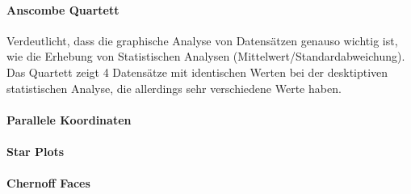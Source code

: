 \documentclass[ngerman]{scrartcl}
\begin{document}
\paragraph{Anscombe Quartett} Verdeutlicht, dass die graphische Analyse von Datensätzen genauso wichtig ist, wie die Erhebung von Statistischen Analysen (Mittelwert/Standardabweichung). Das Quartett zeigt 4 Datensätze mit identischen Werten bei der desktiptiven statistischen Analyse, die allerdings sehr verschiedene Werte haben.

\paragraph{Parallele Koordinaten} 

\paragraph{Star Plots} 

\paragraph{Chernoff Faces}
\end{document}

